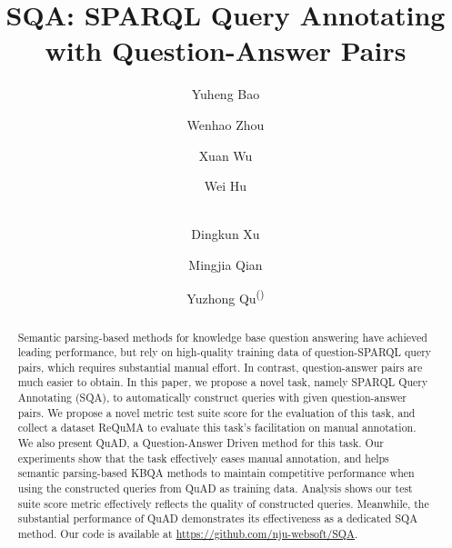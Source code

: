 \documentclass[runningheads]{llncs}
\begin{document}
%
\title{SQA: SPARQL Query Annotating with Question-Answer Pairs}


\author{Yuheng Bao \and Wenhao Zhou \and Xuan Wu \and Wei Hu \and \\ Dingkun Xu \and Mingjia Qian \and Yuzhong Qu\textsuperscript{(\Letter)}}


\maketitle              %
%
\begin{abstract}
Semantic parsing-based methods for knowledge base question answering have achieved leading performance, but rely on high-quality training data of question-SPARQL query pairs, which requires substantial manual effort.
In contrast, question-answer pairs are much easier to obtain.
In this paper, we propose a novel task, namely SPARQL Query Annotating (SQA), to automatically construct queries with given question-answer pairs.
We propose a novel metric test suite score for the evaluation of this task, and collect a dataset ReQuMA to evaluate this task's facilitation on manual annotation.
We also present QuAD, a Question-Answer Driven method for this task.
Our experiments show that the task effectively eases manual annotation, and helps semantic parsing-based KBQA methods to maintain competitive performance when using the constructed queries from QuAD as training data. Analysis shows our test suite score metric effectively reflects the quality of constructed queries. Meanwhile, the substantial performance of QuAD demonstrates its effectiveness as a dedicated SQA method. Our code is available at \url{https://github.com/nju-websoft/SQA}.


\end{abstract}
%
%
%
\end{document}
